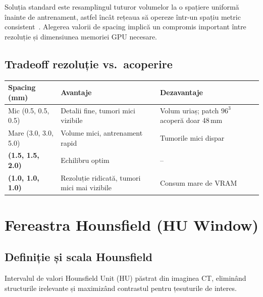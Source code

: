 \documentclass[12pt, a4paper]{report}
\begin{document}
Soluția standard este resamplingul tuturor volumelor la o spațiere uniformă înainte de antrenament,
astfel încât rețeaua să opereze într-un spațiu metric consistent~\cite{isensee2019automated}.
Alegerea valorii de spacing implică un compromis important între rezoluție și dimensiunea memoriei GPU necesare.

\subsection{Tradeoff rezoluție vs.\ acoperire}
\label{sec:spacing_tabel}

\begin{center}
\begin{tabular}{p{3.5cm} p{4.5cm} p{4.5cm}}
    \toprule
    \textbf{Spacing (mm)} & \textbf{Avantaje} & \textbf{Dezavantaje} \\
    \midrule
    Mic (0.5, 0.5, 0.5) &
        Detalii fine, tumori mici vizibile &
        Volum uriaș; patch $96^3$ acoperă doar 48\,mm \\
    \addlinespace
    Mare (3.0, 3.0, 5.0) &
        Volume mici, antrenament rapid &
        Tumorile mici dispar \\
    \addlinespace
    \textbf{(1.5, 1.5, 2.0)} &
        Echilibru optim &
        -- \\
    \addlinespace
    \textbf{(1.0, 1.0, 1.0)} &
        Rezoluție ridicată, tumori mici mai vizibile &
        Consum mare de VRAM \\
    \bottomrule
\end{tabular}
\end{center}



\section{Fereastra Hounsfield (HU Window)}
\label{sec:hu_window}

\subsection{Definiție și scala Hounsfield}

\vspace{4pt}
\begin{infobox}
Intervalul de valori Hounsfield Unit (HU) păstrat din imaginea CT,
eliminând structurile irelevante și maximizând contrastul
pentru țesuturile de interes.
\end{infobox}
\end{document}
